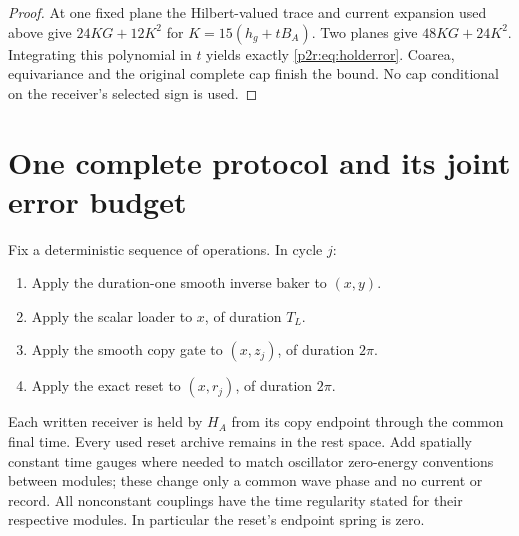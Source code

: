 \documentclass[11pt]{article}
\numberwithin{equation}{section}
\theoremstyle{definition}
\theoremstyle{remark}
\begin{document}
\begin{proof}
At one fixed plane the Hilbert-valued trace and current
expansion used above give $24KG+12K^2$ for
$K=15(h_g+tB_A)$. Two planes give $48KG+24K^2$.
Integrating this polynomial in $t$ yields exactly
\eqref{p2r:eq:holderror}. Coarea, equivariance and the original
complete cap finish the bound. No cap conditional on the
receiver's selected sign is used.
\end{proof}

\section{One complete protocol and its joint error budget}
\label{p2r:sec:composition}

Fix a deterministic sequence of operations. In cycle $j$:
\begin{enumerate}
\item Apply the duration-one smooth inverse baker to $(x,y)$.
\item Apply the scalar loader to $x$, of duration $T_L$.
\item Apply the smooth copy gate to $(x,z_j)$, of duration $2\pi$.
\item Apply the exact reset to $(x,r_j)$, of duration $2\pi$.
\end{enumerate}
Each written receiver is held by $H_A$ from its copy endpoint
through the common final time. Every used reset archive remains
in the rest space. Add spatially constant time gauges where
needed to match oscillator zero-energy conventions between
modules; these change only a common wave phase and no current
or record. All nonconstant couplings have the time regularity stated
for their respective modules. In particular the reset's endpoint spring is zero.
\end{document}
